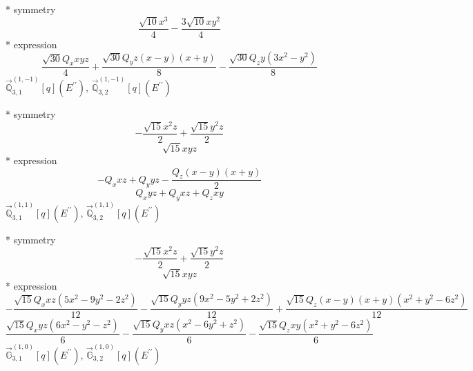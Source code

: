 \documentclass[fleqn,8pt]{jsarticle}
\begin{document}
\noindent\quad ** symmetry
\begin{dmath*}
\frac{\sqrt{10} x^{3}}{4} - \frac{3 \sqrt{10} x y^{2}}{4}
\end{dmath*}
\noindent\quad ** expression
\begin{dmath*}
\frac{\sqrt{30} Q_{x} x y z}{4} + \frac{\sqrt{30} Q_{y} z \left(x - y\right) \left(x + y\right)}{8} - \frac{\sqrt{30} Q_{z} y \left(3 x^{2} - y^{2}\right)}{8}
\end{dmath*}
\noindent\quad $\vec{\mathbb{Q}}_{3,1}^{(1,-1)}[q](E^{\prime\prime})$, $\vec{\mathbb{Q}}_{3,2}^{(1,-1)}[q](E^{\prime\prime})$

\noindent\quad ** symmetry
\begin{dmath*}
- \frac{\sqrt{15} x^{2} z}{2} + \frac{\sqrt{15} y^{2} z}{2}
\end{dmath*}
\begin{dmath*}
\sqrt{15} x y z
\end{dmath*}
\noindent\quad ** expression
\begin{dmath*}
- Q_{x} x z + Q_{y} y z - \frac{Q_{z} \left(x - y\right) \left(x + y\right)}{2}
\end{dmath*}
\begin{dmath*}
Q_{x} y z + Q_{y} x z + Q_{z} x y
\end{dmath*}
\noindent\quad $\vec{\mathbb{Q}}_{3,1}^{(1,1)}[q](E^{\prime\prime})$, $\vec{\mathbb{Q}}_{3,2}^{(1,1)}[q](E^{\prime\prime})$

\noindent\quad ** symmetry
\begin{dmath*}
- \frac{\sqrt{15} x^{2} z}{2} + \frac{\sqrt{15} y^{2} z}{2}
\end{dmath*}
\begin{dmath*}
\sqrt{15} x y z
\end{dmath*}
\noindent\quad ** expression
\begin{dmath*}
- \frac{\sqrt{15} Q_{x} x z \left(5 x^{2} - 9 y^{2} - 2 z^{2}\right)}{12} - \frac{\sqrt{15} Q_{y} y z \left(9 x^{2} - 5 y^{2} + 2 z^{2}\right)}{12} + \frac{\sqrt{15} Q_{z} \left(x - y\right) \left(x + y\right) \left(x^{2} + y^{2} - 6 z^{2}\right)}{12}
\end{dmath*}
\begin{dmath*}
\frac{\sqrt{15} Q_{x} y z \left(6 x^{2} - y^{2} - z^{2}\right)}{6} - \frac{\sqrt{15} Q_{y} x z \left(x^{2} - 6 y^{2} + z^{2}\right)}{6} - \frac{\sqrt{15} Q_{z} x y \left(x^{2} + y^{2} - 6 z^{2}\right)}{6}
\end{dmath*}
\noindent\quad $\vec{\mathbb{G}}_{3,1}^{(1,0)}[q](E^{\prime\prime})$, $\vec{\mathbb{G}}_{3,2}^{(1,0)}[q](E^{\prime\prime})$
\end{document}
